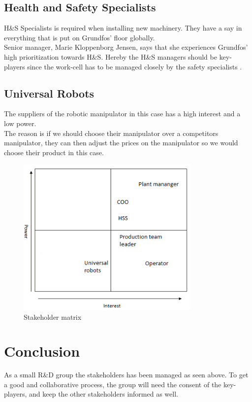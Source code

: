 \subsection{Health and Safety Specialists}\label{ch:SafetyPersonel} 

H\&S Specialists is required when installing new machinery. They have a say in everything that is put on Grundfos' floor globally.\\ 
Senior manager, Marie Kloppenborg Jensen, says that she experiences Grundfos' high prioritization towards H\&S. Hereby the H\&S managers should be key-players since the work-cell has to be managed closely by the safety specialists \cite{H&S}.\\ 

\subsection{Universal Robots}\label{ch:Universalrobots-stake}
The suppliers of the robotic manipulator in this case has a high interest and a low power.\\The reason is if we should choose their manipulator over a competitors manipulator, they can then adjust the prices on the manipulator so we would choose their product in this case. \\ 

\begin{figure}[h]
    \centering
     \includegraphics[width=9cm]{StakeholderAnalysis/matrix.PNG}
    \caption{Stakeholder matrix}
    \label{fig:Stackholder matrix}
\end{figure}

\section{Conclusion}
As a small R\&D group the stakeholders has been managed as seen above. To get a good and collaborative process, the group will need the consent of the key-players, and keep the other stakeholders informed as well. 

